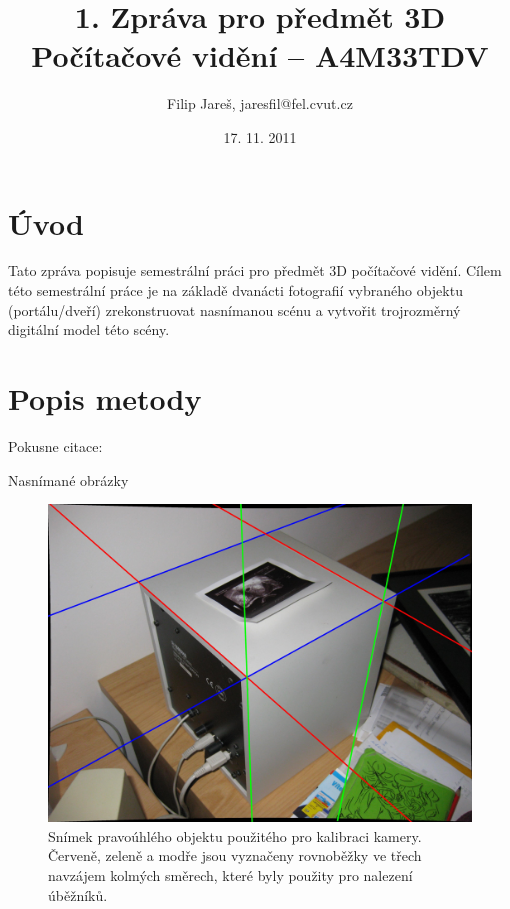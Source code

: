 \documentclass[11pt,oneside,a4paper,pdftex]{article}   %
\title{1. Zpráva pro předmět 3D Počítačové vidění -- A4M33TDV}
\date{17. 11. 2011}
\author{Filip Jareš, jaresfil@fel.cvut.cz}
\begin{document}
\maketitle

\section{Úvod}

Tato zpráva popisuje semestrální práci pro předmět 3D počítačové vidění. Cílem této semestrální
práce je na základě dvanácti fotografií vybraného objektu (portálu/dveří) zrekonstruovat nasnímanou
scénu a vytvořit trojrozměrný digitální model této scény.


%


\section{Popis metody}

Pokusne citace:
\cite{Hartley2004}
\cite{SaraLectures}


Nasnímané obrázky

	\begin{figure}[htb]
		\centering
		\includegraphics[width=16cm]{pictures/linear/cube.jpg}
		\caption{Snímek pravoúhlého objektu použitého pro kalibraci kamery. Červeně, zeleně
		a modře jsou vyznačeny rovnoběžky ve třech navzájem kolmých směrech, které byly
		použity pro nalezení úběžníků.}
		\label{fig:cube}
	\end{figure}
\end{document}
